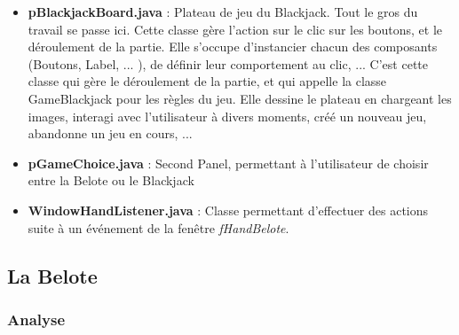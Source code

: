 \documentclass[a4paper]{report}
\begin{document}
\begin{itemize}
\item \textbf{pBlackjackBoard.java} : Plateau de jeu du Blackjack. Tout le gros du travail se passe ici. Cette classe gère l'action sur le clic sur les boutons, et le déroulement de la partie. Elle s'occupe d'instancier chacun des composants (Boutons, Label, ... ), de définir leur comportement au clic, ... C'est cette classe qui gère le déroulement de la partie, et qui appelle la classe GameBlackjack pour les règles du jeu. Elle dessine le plateau en chargeant les images, interagi avec l'utilisateur à divers moments, créé un nouveau jeu, abandonne un jeu en cours, ...
\item \textbf{pGameChoice.java} : Second Panel, permettant à l'utilisateur de choisir entre la Belote ou le Blackjack
\item \textbf{WindowHandListener.java} : Classe permettant d'effectuer des actions suite à un événement de la fenêtre \textit{fHandBelote}. 
\end{itemize}

\subsection{La Belote}
\subsubsection{Analyse}
\end{document}
